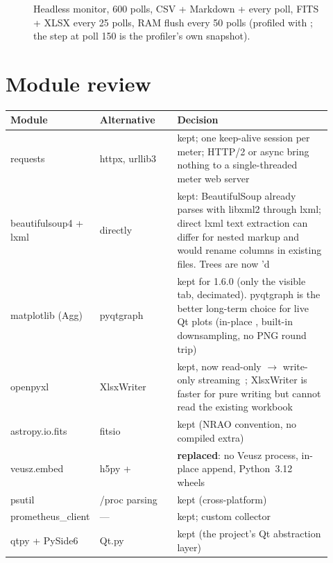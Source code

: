 \documentclass[11pt,a4paper]{article}
\newcommand{\code}[1]{\texttt{\detokenize{#1}}}
\begin{document}
\begin{figure}[ht]
  \centering
  \caption{Headless monitor, 600 polls, CSV + Markdown + \code{.vszh5} every poll,
  FITS + XLSX every 25 polls, RAM flush every 50 polls (profiled with
  \code{tracemalloc}; the step at poll 150 is the profiler's own snapshot).}
  \label{fig:headless}
\end{figure}

\section{Module review}
\begin{longtable}{@{}p{0.2\linewidth}p{0.24\linewidth}p{0.48\linewidth}@{}}
\toprule
Module & Alternative & Decision \\
\midrule
\endhead
requests & httpx, urllib3 & kept; one keep-alive session per meter; HTTP/2 or async bring nothing to a single-threaded meter web server \\
beautifulsoup4 + lxml & \code{lxml.html} directly & kept: BeautifulSoup already parses with libxml2 through lxml; direct lxml text extraction can differ for nested markup and would rename columns in existing files. Trees are now \code{decompose()}'d \\
matplotlib (Agg) & pyqtgraph & kept for 1.6.0 (only the visible tab, decimated). pyqtgraph is the better long-term choice for live Qt plots (in-place \code{setData}, built-in downsampling, no PNG round trip) \\
openpyxl & XlsxWriter & kept, now read-only $\rightarrow$ write-only streaming~\cite{openpyxl_opt}; XlsxWriter is faster for pure writing but cannot read the existing workbook \\
astropy.io.fits & fitsio & kept (NRAO convention, no compiled extra) \\
veusz.embed & h5py + \code{vszh5_writer} & \textbf{replaced}: no Veusz process, in-place append, Python~3.12 wheels \\
psutil & /proc parsing & kept (cross-platform) \\
prometheus\_client & --- & kept; custom collector \\
qtpy + PySide6 & Qt.py & kept (the project's Qt abstraction layer) \\
\bottomrule
\end{longtable}
\end{document}
